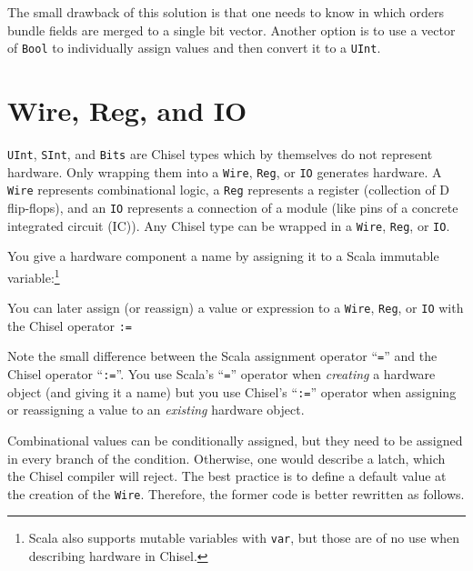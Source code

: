 \documentclass[%
    10pt,
    headinclude, footexclude,
    openright, %
    notitlepage,
    cleardoubleempty,
    headsepline,
    pointlessnumbers,
    bibtotoc, idxtotoc,
    ]{scrbook}
\newcommand{\code}[1]{{\small{\texttt{#1}}}}
\newcommand{\codefoot}[1]{{\footnotesize{\texttt{#1}}}}
\begin{document}

\noindent The small drawback of this solution is that one needs to know in which orders
bundle fields are merged to a single bit vector. Another option is to use a vector of \code{Bool}
to individually assign values and then convert it to a \code{UInt}.


\section{Wire, Reg, and IO}

\code{UInt}, \code{SInt}, and \code{Bits} are Chisel types which by themselves do not
represent hardware. Only wrapping them into a \code{Wire}, \code{Reg}, or \code{IO}
generates hardware. A \code{Wire} represents combinational logic, a \code{Reg}
represents a register (collection of D flip-flops), and an \code{IO} represents a
connection of a module (like pins of a concrete integrated circuit (IC)).
Any Chisel type can be wrapped in a \code{Wire}, \code{Reg}, or \code{IO}.

You give a hardware component a name by assigning it to a Scala immutable
variable:\footnote{Scala also supports mutable variables with \codefoot{var}, but those are of no use
when describing hardware in Chisel.}


\noindent You can later assign (or reassign) a value or expression to a \code{Wire}, \code{Reg}, or \code{IO}
with the Chisel operator \code{:=}


\noindent Note the small difference between the Scala assignment operator ``\code{=}''
and the Chisel operator ``\code{:=}''. You use Scala's ``\code{=}'' operator when \emph{creating} a hardware
object (and giving it a name) but you use Chisel's ``\code{:=}'' operator when assigning or reassigning a value to
an \emph{existing} hardware object.

Combinational values can be conditionally assigned, but they need to be assigned in every branch
of the condition. Otherwise, one would describe a latch, which the Chisel compiler will reject.
The best practice is to define a default value at the creation of the \code{Wire}.
Therefore, the former code is better rewritten as follows.
\end{document}
